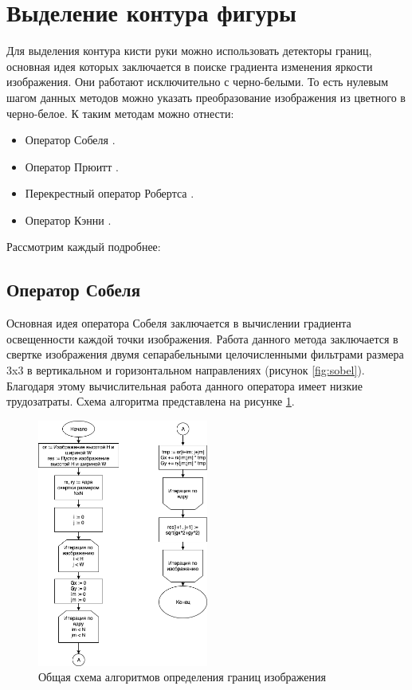 \section{Выделение контура фигуры}
\label{sec:Edge}

Для выделения контура кисти руки можно использовать детекторы границ, основная идея которых заключается в поиске градиента изменения яркости изображения. Они работают исключительно с черно-белыми. То есть нулевым шагом данных методов можно указать преобразование изображения из цветного в черно-белое. К таким методам можно отнести:

\begin{itemize}
	\item Оператор Собеля \cite{Sobel}.
	\item Оператор Прюитт \cite{Prewitt}.
	\item Перекрестный оператор Робертса \cite{Roberts}.
	\item Оператор Кэнни \cite{Canny}.
\end{itemize}

Рассмотрим каждый подробнее:

\subsection{Оператор Собеля}

Основная идея оператора Собеля\cite{Sobel} заключается в вычислении градиента освещенности каждой точки изображения. Работа данного метода заключается в  свертке изображения двумя сепарабельными целочисленными фильтрами размера 3x3 в вертикальном и горизонтальном направлениях (рисунок \ref{fig:sobel}). Благодаря этому вычислительная работа данного оператора имеет низкие трудозатраты. Схема алгоритма представлена на рисунке \ref{fig:sobel-block}.

\begin{figure}[!h]
	\centering
	\includegraphics[width=0.5\textwidth,keepaspectratio]{figures/ru/sobel-block.png}
	\caption{Общая схема алгоритмов определения границ изображения}
	\label{fig:sobel-block}
\end{figure}

